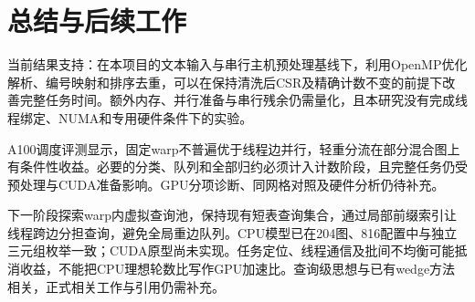 \section{总结与后续工作}
当前结果支持：在本项目的文本输入与串行主机预处理基线下，利用OpenMP优化解析、编号映射和排序去重，可以在保持清洗后CSR及精确计数不变的前提下改善完整任务时间。额外内存、并行准备与串行残余仍需量化，且本研究没有完成线程绑定、NUMA和专用硬件条件下的实验。

A100调度评测显示，固定warp不普遍优于线程边并行，轻重分流在部分混合图上有条件性收益。必要的分类、队列和全部归约必须计入计数阶段，且完整任务仍受预处理与CUDA准备影响。GPU分项诊断、同网格对照及硬件分析仍待补充。

下一阶段探索warp内虚拟查询池，保持现有短表查询集合，通过局部前缀索引让线程跨边分担查询，避免全局重边队列。CPU模型已在204图、816配置中与独立三元组枚举一致；CUDA原型尚未实现。任务定位、线程通信及批间不均衡可能抵消收益，不能把CPU理想轮数比写作GPU加速比。查询级思想与已有wedge方法相关，正式相关工作与引用仍需补充。
